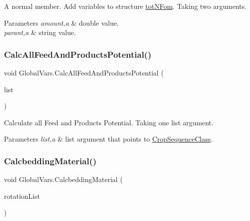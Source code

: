 A normal member. Add variables to structure \mbox{\hyperlink{struct_global_vars_1_1tot_n_fom}{tot\+N\+Fom}}. Taking two arguments. 


\begin{DoxyParams}{Parameters}
{\em amount,a} & double value. \\
\hline
{\em parant,a} & string value. \\
\hline
\end{DoxyParams}
\mbox{\label{class_global_vars_ae96481c7f7db5cf25742d29ced57b3c0}} 
\subsubsection{\texorpdfstring{CalcAllFeedAndProductsPotential()}{CalcAllFeedAndProductsPotential()}}
{\footnotesize\ttfamily void Global\+Vars.\+Calc\+All\+Feed\+And\+Products\+Potential (\begin{DoxyParamCaption}\item[{List$<$ \mbox{\hyperlink{class_crop_sequence_class}{Crop\+Sequence\+Class}} $>$}]{list }\end{DoxyParamCaption})\hspace{0.3cm}{\ttfamily [inline]}}



Calculate all Feed and Products Potential. Taking one list argument. 


\begin{DoxyParams}{Parameters}
{\em list,a} & list argument that points to \mbox{\hyperlink{class_crop_sequence_class}{Crop\+Sequence\+Class}}. \\
\hline
\end{DoxyParams}
\mbox{\label{class_global_vars_a0646815f7f1f52f4b870f0cde29b0109}} 
\subsubsection{\texorpdfstring{CalcbeddingMaterial()}{CalcbeddingMaterial()}}
{\footnotesize\ttfamily void Global\+Vars.\+Calcbedding\+Material (\begin{DoxyParamCaption}\item[{List$<$ \mbox{\hyperlink{class_crop_sequence_class}{Crop\+Sequence\+Class}} $>$}]{rotation\+List }\end{DoxyParamCaption})\hspace{0.3cm}{\ttfamily [inline]}}



